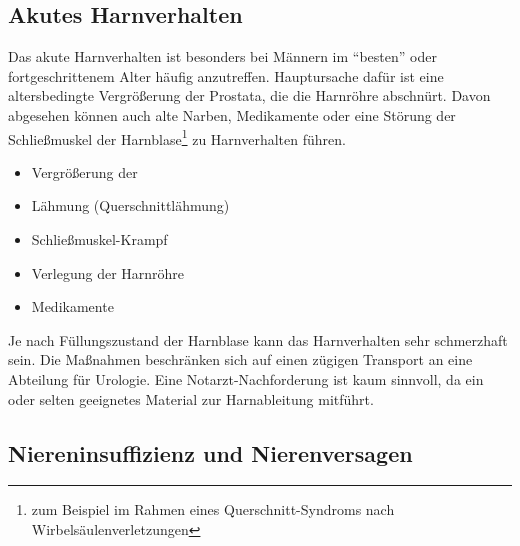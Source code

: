 \subsection{Akutes Harnverhalten}
\label{topic:harnverhalten}






{%
Das akute Harnverhalten ist besonders bei Männern im \enquote{besten}
oder fortgeschrittenem Alter häufig anzutreffen. Hauptursache  dafür ist eine altersbedingte Vergrößerung der
Prostata, die die Harnröhre abschnürt. Davon abgesehen
können auch alte Narben, Medikamente oder eine Störung der
Schließmuskel der Harnblase\footnote{zum Beispiel im Rahmen
eines Querschnitt-Syndroms nach Wirbelsäulenverletzungen} zu
Harnverhalten führen.
}
{
\begin{itemize}
  \item Vergrößerung der 
  \item Lähmung (Querschnittlähmung)
  \item Schließmuskel-Krampf
  \item Verlegung der Harnröhre
  \item Medikamente
\end{itemize}
}{}{}{}

Je nach Füllungszustand der Harnblase kann das
Harnverhalten sehr schmerzhaft sein.
Die Maßnahmen beschränken sich auf einen zügigen Transport
an eine Abteilung für Urologie. Eine Notarzt-Nachforderung
ist kaum sinnvoll, da ein  oder  selten geeignetes
Material zur Harnableitung mitführt. 

{
}{}




\subsection{Niereninsuffizienz und Nierenversagen}
\label{topic:niereninsuffizienz}
\label{topic:cni-therapie-dialyse}
\label{topic:dialysepatienten-gefahren}

